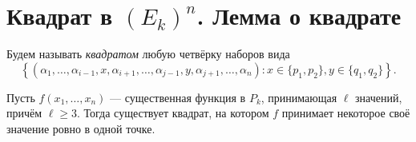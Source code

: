 \section{Квадрат в $(E_k)^n$. Лемма о квадрате}

\begin{definition}
    Будем называть \textit{квадратом} любую четвёрку наборов вида
    \[
        \left\{(\alpha_1, \ldots, \alpha_{i - 1}, x, \alpha_{i + 1}, \ldots, \alpha_{j - 1}, y, \alpha_{j + 1}, \ldots, \alpha_n) : x \in \{p_1, p_2\}, y \in \{q_1, q_2\}\right\}.
    \]
\end{definition}

\begin{lemma}[О квадрате]
    Пусть $f(x_1, \ldots, x_n)$ --- существенная функция в $P_k$, принимающая $\ell$ значений, причём $\ell \geqslant 3$. Тогда существует квадрат, на котором $f$ принимает некоторое своё значение ровно в одной точке.
\end{lemma}

